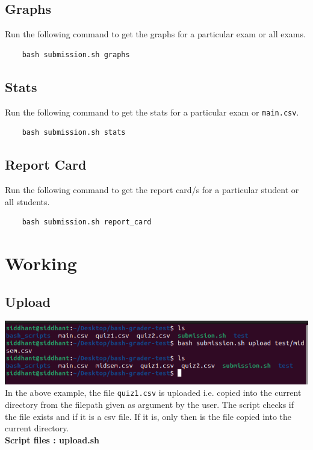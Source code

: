 \documentclass{article}
\begin{document}
\subsection{Graphs}
Run the following command to get the graphs for a particular exam or all exams.
\begin{verbatim}
    bash submission.sh graphs
\end{verbatim}

\subsection{Stats}
Run the following command to get the stats for a particular exam or \verb"main.csv".
\begin{verbatim}
    bash submission.sh stats
\end{verbatim}

\subsection{Report Card}
Run the following command to get the report card/s for a particular student or all students.  
\begin{verbatim}
    bash submission.sh report_card
\end{verbatim}

\section{Working}
\subsection{Upload}
\includegraphics[width=\textwidth]{upload.png}
In the above example, the file \verb"quiz1.csv" is uploaded i.e. copied into the current directory from the filepath given as argument by the user.
The script checks if the file exists and if it is a csv file. If it is, only then is the file copied into the current directory.\\
\textbf{Script files : upload.sh }
\end{document}
